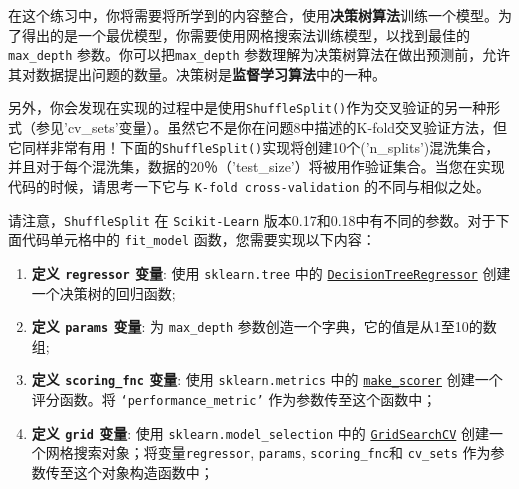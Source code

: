 \documentclass[11pt]{article}
\providecommand{\tightlist}{%
      \setlength{\itemsep}{0pt}\setlength{\parskip}{0pt}}
\begin{document}
在这个练习中，你将需要将所学到的内容整合，使用\textbf{决策树算法}训练一个模型。为了得出的是一个最优模型，你需要使用网格搜索法训练模型，以找到最佳的
\texttt{\textquotesingle{}max\_depth\textquotesingle{}}
参数。你可以把\texttt{\textquotesingle{}max\_depth\textquotesingle{}}
参数理解为决策树算法在做出预测前，允许其对数据提出问题的数量。决策树是\textbf{监督学习算法}中的一种。

另外，你会发现在实现的过程中是使用\texttt{ShuffleSplit()}作为交叉验证的另一种形式（参见'cv\_sets'变量）。虽然它不是你在问题8中描述的K-fold交叉验证方法，但它同样非常有用！下面的\texttt{ShuffleSplit()}实现将创建10个('n\_splits')混洗集合，并且对于每个混洗集，数据的20％（'test\_size'）将被用作验证集合。当您在实现代码的时候，请思考一下它与
\texttt{K-fold\ cross-validation} 的不同与相似之处。

请注意，\texttt{ShuffleSplit} 在 \texttt{Scikit-Learn}
版本0.17和0.18中有不同的参数。对于下面代码单元格中的 \texttt{fit\_model}
函数，您需要实现以下内容：

\begin{enumerate}
\def\labelenumi{\arabic{enumi}.}
\tightlist
\item
  \textbf{定义 \texttt{\textquotesingle{}regressor\textquotesingle{}}
  变量}: 使用 \texttt{sklearn.tree} 中的
  \href{http://scikit-learn.org/stable/modules/generated/sklearn.tree.DecisionTreeRegressor.html}{\texttt{DecisionTreeRegressor}}
  创建一个决策树的回归函数;
\item
  \textbf{定义 \texttt{\textquotesingle{}params\textquotesingle{}}
  变量}: 为 \texttt{\textquotesingle{}max\_depth\textquotesingle{}}
  参数创造一个字典，它的值是从1至10的数组;
\item
  \textbf{定义 \texttt{\textquotesingle{}scoring\_fnc\textquotesingle{}}
  变量}: 使用 \texttt{sklearn.metrics} 中的
  \href{http://scikit-learn.org/stable/modules/generated/sklearn.metrics.make_scorer.html}{\texttt{make\_scorer}}
  创建一个评分函数。将 \texttt{‘performance\_metric’}
  作为参数传至这个函数中；
\item
  \textbf{定义 \texttt{\textquotesingle{}grid\textquotesingle{}} 变量}:
  使用 \texttt{sklearn.model\_selection} 中的
  \href{http://scikit-learn.org/stable/modules/generated/sklearn.model_selection.GridSearchCV.html}{\texttt{GridSearchCV}}
  创建一个网格搜索对象；将变量\texttt{\textquotesingle{}regressor\textquotesingle{}},
  \texttt{\textquotesingle{}params\textquotesingle{}},
  \texttt{\textquotesingle{}scoring\_fnc\textquotesingle{}}和
  \texttt{\textquotesingle{}cv\_sets\textquotesingle{}}
  作为参数传至这个对象构造函数中；
\end{enumerate}
\end{document}
